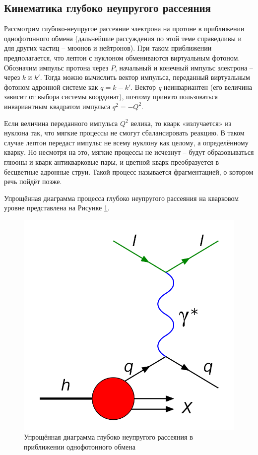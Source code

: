 \documentclass{extarticle}
\begin{document}
\subsection{Кинематика глубоко неупругого рассеяния}
Рассмотрим глубоко-неупругое рассеяние электрона на протоне в приближении однофотонного обмена (дальнейшие рассуждения по этой теме справедливы и для других частиц – мюонов и нейтронов). При таком приближении предполагается, что лептон с нуклоном обмениваются виртуальным фотоном. Обозначим импульс протона через $P$, начальный и конечный импульс электрона – через $k$ и $k'$. Тогда можно вычислить вектор импульса, переданный виртуальным фотоном адронной системе как $q=k-k'$. Вектор \textit{q} неинвариантен (его величина зависит от выбора системы координат), поэтому принято пользоваться инвариантным квадратом импульса $q^2=-Q^2$.

Если величина переданного импульса $Q^2$ велика, то кварк «излучается» из нуклона так, что мягкие процессы не смогут сбалансировать реакцию. В таком случае лептон передаст импульс не всему нуклону как целому, а определённому кварку. Но несмотря на это, мягкие процессы не исчезнут – будут образовываться глюоны и кварк-антикварковые пары, и цветной кварк преобразуется в бесцветные адронные струи. Такой процесс называется фрагментацией, о котором речь пойдёт позже.

Упрощённая диаграмма процесса глубоко неупругого рассеяния на кварковом уровне представлена на Рисунке \ref{fig:DIS}.
\newpage

\begin{figure}[h!]
    \centering
    \includegraphics[width = 0.7\linewidth]{DIS.png}
    \caption{Упрощённая диаграмма глубоко неупругого рассеяния в приближении однофотонного обмена}
    \label{fig:DIS}
\end{figure}
\end{document}
